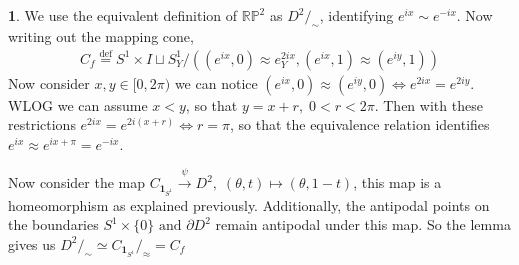 \documentclass[10.5pt]{article}
\theoremstyle{definition}
\newtheorem{pb}{}
\newcommand{\set}[1]{\{#1\}}
\newcommand{\tand}{\text{ and }}
\newcommand{\ism}{\simeq}
\begin{document}
    \begin{pb}
        We use the equivalent definition of \(\mathbb{R}\mathbb{P}^2\) as \(D^2/_\sim\), identifying \(e^{ix} \sim e^{-ix}\). Now writing out the mapping cone,
        \begin{align*}
            C_f \overset{\text{def}}{=} S^1 \times I \sqcup S^1_Y / ((e^{ix},0) \approx e^{2ix}_Y, (e^{ix},1) \approx (e^{iy},1))
        \end{align*}
        Now consider \(x, y \in [0,2\pi)\) we can notice \((e^{ix},0) \approx (e^{iy},0) \iff e^{2ix} = e^{2iy}\). WLOG we can assume \(x < y\), so that \(y = x + r, \; 0 < r < 2\pi\).
        Then with these restrictions \(e^{2ix} = e^{2i(x + r)} \iff r = \pi\), so that the equivalence relation identifies \(e^{ix} \approx e^{ix + \pi} = e^{-ix}\).

        Now consider the map \(C_{\mathbf{1}_{S^1}} \overset{\psi}{\to} D^2, \; (\theta,t) \mapsto (\theta,1-t)\), this map is a homeomorphism as explained previously.
        Additionally, the antipodal points on the boundaries 
        \(S^1 \times \set{0} \tand \partial D^2\) remain antipodal under this map. So the lemma gives us \(D^2/_\sim \ism C_{\mathbf{1}_{S^1}}/_\approx = C_f\)
    \end{pb}
\end{document}

